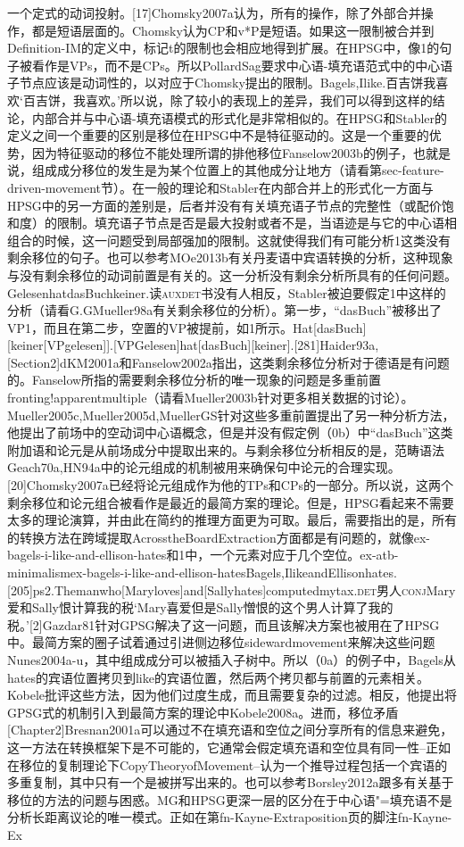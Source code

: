 一个定式的动词投射。[17]Chomsky2007a认为，所有的操作，除了外部合并操作，都是短语层面的。Chomsky认为CP和v*P是短语。如果这一限制被合并到Definition-IM的定义中，标记t的限制也会相应地得到扩展。在HPSG中，像1的句子被看作是VPs，而不是CPs。所以PollardSag要求中心语-填充语范式中的中心语子节点应该是动词性的，以对应于Chomsky提出的限制。Bagels,Ilike.百吉饼我喜欢`百吉饼，我喜欢。'所以说，除了较小的表现上的差异，我们可以得到这样的结论，内部合并与中心语-填充语模式的形式化是非常相似的。在HPSG和Stabler的定义之间一个重要的区别是移位在HPSG中不是特征驱动的。这是一个重要的优势，因为特征驱动的移位不能处理所谓的排他移位Fanselow2003b的例子，也就是说，组成成分移位的发生是为某个位置上的其他成分让地方（请看第sec-feature-driven-movement节）。在一般的理论和Stabler在内部合并上的形式化一方面与HPSG中的另一方面的差别是，后者并没有有关填充语子节点的完整性（或配价饱和度）的限制。填充语子节点是否是最大投射或者不是，当语迹是与它的中心语相组合的时候，这一问题受到局部强加的限制。这就使得我们有可能分析1这类没有剩余移位的句子。也可以参考MOe2013b有关丹麦语中宾语转换的分析，这种现象与没有剩余移位的动词前置是有关的。这一分析没有剩余分析所具有的任何问题。GelesenhatdasBuchkeiner.读\textsc{aux}\textsc{det}书没有人相反，Stabler被迫要假定1中这样的分析（请看G.GMueller98a有关剩余移位的分析）。第一步，“dasBuch”被移出了VP1，而且在第二步，空置的VP被提前，如1所示。Hat[dasBuch][keiner[VPgelesen]].[VPGelesen]hat[dasBuch][keiner].[281]Haider93a,[Section2]dKM2001a和Fanselow2002a指出，这类剩余移位分析对于德语是有问题的。Fanselow所指的需要剩余移位分析的唯一现象的问题是多重前置fronting!apparentmultiple（请看Mueller2003b针对更多相关数据的讨论）。Mueller2005c,Mueller2005d,MuellerGS针对这些多重前置提出了另一种分析方法，他提出了前场中的空动词中心语概念，但是并没有假定例（0b）中“dasBuch”这类附加语和论元是从前场成分中提取出来的。与剩余移位分析相反的是，范畴语法Geach70a,HN94a中的论元组成的机制被用来确保句中论元的合理实现。[20]Chomsky2007a已经将论元组成作为他的TPs和CPs的一部分。所以说，这两个剩余移位和论元组合被看作是最近的最简方案的理论。但是，HPSG看起来不需要太多的理论演算，并由此在简约的推理方面更为可取。最后，需要指出的是，所有的转换方法在跨域提取AcrosstheBoardExtraction方面都是有问题的，就像ex-bagels-i-like-and-ellison-hates和1中，一个元素对应于几个空位。ex-atb-minimalismex-bagels-i-like-and-ellison-hatesBagels,IlikeandEllisonhates.[205]ps2.Themanwho[Maryloves]and[Sallyhates]computedmytax.\textsc{det}男人\textsc{conj}Mary爱和Sally恨计算我的税`Mary喜爱但是Sally憎恨的这个男人计算了我的税。'[2]Gazdar81针对GPSG解决了这一问题，而且该解决方案也被用在了HPSG中。最简方案的圈子试着通过引进侧边移位sidewardmovement来解决这些问题Nunes2004a-u，其中组成成分可以被插入子树中。所以（0a）的例子中，Bagels从hates的宾语位置拷贝到like的宾语位置，然后两个拷贝都与前置的元素相关。Kobele批评这些方法，因为他们过度生成，而且需要复杂的过滤。相反，他提出将GPSG式的机制引入到最简方案的理论中Kobele2008a。进而，移位矛盾[Chapter2]Bresnan2001a可以通过不在填充语和空位之间分享所有的信息来避免，这一方法在转换框架下是不可能的，它通常会假定填充语和空位具有同一性--正如在移位的复制理论下CopyTheoryofMovement--认为一个推导过程包括一个宾语的多重复制，其中只有一个是被拼写出来的。也可以参考Borsley2012a跟多有关基于移位的方法的问题与困惑。MG和HPSG更深一层的区分在于中心语"=填充语不是分析长距离议论的唯一模式。正如在第fn-Kayne-Extraposition页的脚注fn-Kayne-Ex